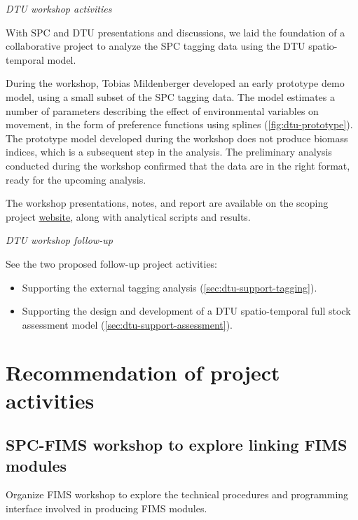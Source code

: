 \documentclass{SCreport}
\newcommand\tree
{https://github.com/PacificCommunity/ofp-sam-transition-plan/tree/main}
\begin{document}
\vspace{2ex}

\textit{DTU workshop activities}

With SPC and DTU presentations and discussions, we laid the foundation of a
collaborative project to analyze the SPC tagging data using the DTU
spatio-temporal model.

During the workshop, Tobias Mildenberger developed an early prototype demo
model, using a small subset of the SPC tagging data. The model estimates a
number of parameters describing the effect of environmental variables on
movement, in the form of preference functions using splines
(\autoref{fig:dtu-prototype}). The prototype model developed during the workshop
does not produce biomass indices, which is a subsequent step in the analysis.
The preliminary analysis conducted during the workshop confirmed that the data
are in the right format, ready for the upcoming analysis.

The workshop presentations, notes, and report are available on the scoping
project \href{\tree/workshops/2025-05-copenhagen}{website}, along with
analytical scripts and results.

\vspace{2ex}

\textit{DTU workshop follow-up}

See the two proposed follow-up project activities:

\begin{itemize}
  \item Supporting the external tagging analysis
  (\autoref{sec:dtu-support-tagging}).
  \item Supporting the design and development of a DTU spatio-temporal full
  stock assessment model (\autoref{sec:dtu-support-assessment}).
\end{itemize}

\section{Recommendation of project activities}

\subsection{SPC-FIMS workshop to explore linking FIMS modules}
\label{sec:fims-workshop}

Organize FIMS workshop to explore the technical procedures and programming
interface involved in producing FIMS modules.
\end{document}
